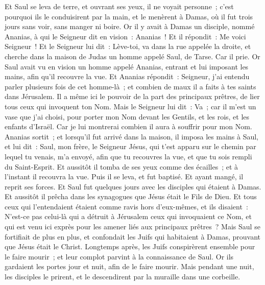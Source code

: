 \begin{multicols}{2}
Et Saul se leva de terre, et ouvrant ses yeux, il ne voyait personne~; c'est pourquoi ils le conduisirent par la main, et le menèrent à Damas,
où il fut trois jours sans voir, sans manger ni boire.
Or il y avait à Damas un disciple, nommé Ananias, à qui le Seigneur dit en vision~: Ananias~! Et il répondit~: Me voici Seigneur~!
Et le Seigneur lui dit~: Lève-toi, va dans la rue appelée la droite, et cherche dans la maison de Judas un homme appelé Saul, de Tarse.
Car il prie. Or Saul avait vu en vision un homme appelé Ananias, entrant et lui imposant les mains, afin qu'il recouvre la vue. Et Ananias répondit~:
 Seigneur, j'ai entendu parler plusieurs fois de cet homme-là~; et combien de maux il a faits à tes saints dans Jérusalem.
Il a même ici le pouvoir de la part des principaux prêtres, de lier tous ceux qui invoquent ton Nom.
Mais le Seigneur lui dit~: Va~; car il m'est un vase que j'ai choisi, pour porter mon Nom devant les Gentils, et les rois, et les enfants d'Israël.
Car je lui montrerai combien il aura à souffrir pour mon Nom.
Ananias sortit~; et lorsqu'il fut arrivé dans la maison, il imposa les mains à Saul, et lui dit~: Saul, mon frère, le Seigneur Jésus, qui t'est apparu sur le chemin par lequel tu venais, m'a envoyé, afin que tu recouvres la vue, et que tu sois rempli du Saint-Esprit.
Et aussitôt il tomba de ses yeux comme des écailles~; et à l'instant il recouvra la vue. Puis il se leva, et fut baptisé.
Et ayant mangé, il reprit ses forces. Et Saul fut quelques jours avec les disciples qui étaient à Damas.
Et aussitôt il prêcha dans les synagogues que Jésus était le Fils de Dieu.
Et tous ceux qui l'entendaient étaient comme ravis hors d'eux-mêmes, et ils disaient~: N'est-ce pas celui-là qui a détruit à Jérusalem ceux qui invoquaient ce Nom, et qui est venu ici exprès pour les amener liés aux principaux prêtres~?
Mais Saul se fortifiait de plus en plus, et confondait les Juifs qui habitaient à Damas, prouvant que Jésus était le Christ.
Longtemps après, les Juifs conspirèrent ensemble pour le faire mourir~;
et leur complot parvint à la connaissance de Saul. Or ils gardaient les portes jour et nuit, afin de le faire mourir.
Mais pendant une nuit, les disciples le prirent, et le descendirent par la muraille dans une corbeille.

\end{multicols}
